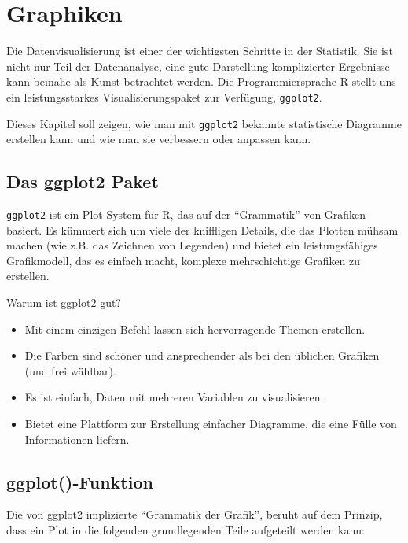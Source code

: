 \documentclass[
]{book}
\begin{document}
\hypertarget{graphiken}{%
\chapter{Graphiken}\label{graphiken}}

Die Datenvisualisierung ist einer der wichtigsten Schritte in der Statistik. Sie ist nicht nur Teil der Datenanalyse, eine gute Darstellung komplizierter Ergebnisse kann beinahe als Kunst betrachtet werden. Die Programmiersprache R stellt uns ein leistungsstarkes Visualisierungspaket zur Verfügung, \texttt{ggplot2}.

Dieses Kapitel soll zeigen, wie man mit \texttt{ggplot2} bekannte statistische Diagramme erstellen kann und wie man sie verbessern oder anpassen kann.

\hypertarget{das-ggplot2-paket}{%
\section{Das ggplot2 Paket}\label{das-ggplot2-paket}}

\texttt{ggplot2} ist ein Plot-System für R, das auf der ``Grammatik'' von Grafiken basiert. Es kümmert sich um viele der kniffligen Details, die das Plotten mühsam machen (wie z.B. das Zeichnen von Legenden) und bietet ein leistungsfähiges Grafikmodell, das es einfach macht, komplexe mehrschichtige Grafiken zu erstellen.

Warum ist ggplot2 gut?

\begin{itemize}
\item
  Mit einem einzigen Befehl lassen sich hervorragende Themen erstellen.
\item
  Die Farben sind schöner und ansprechender als bei den üblichen Grafiken (und frei wählbar).
\item
  Es ist einfach, Daten mit mehreren Variablen zu visualisieren.
\item
  Bietet eine Plattform zur Erstellung einfacher Diagramme, die eine Fülle von Informationen liefern.
\end{itemize}

\hypertarget{ggplot-funktion}{%
\section{ggplot()-Funktion}\label{ggplot-funktion}}

Die von ggplot2 implizierte ``Grammatik der Grafik'', beruht auf dem Prinzip, dass ein Plot in die folgenden grundlegenden Teile aufgeteilt werden kann:
\end{document}
